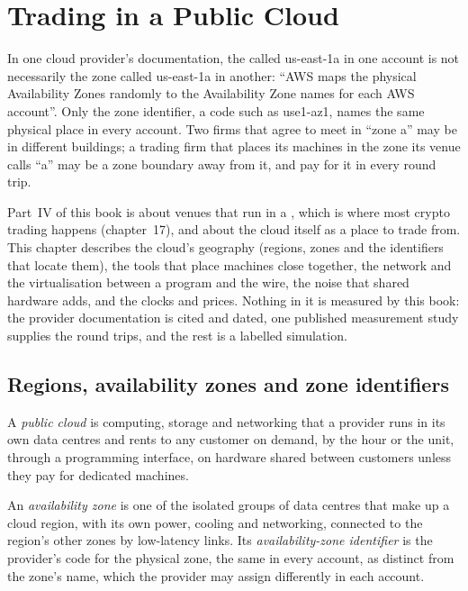 \chapter{Trading in a Public Cloud}\label{ch:nw:trading-in-a-public-cloud}

In one cloud provider's documentation, the  called us-east-1a in one account is not necessarily the zone called us-east-1a
in another: ``AWS maps the physical Availability Zones randomly to the Availability Zone names for each AWS account''. Only the zone
identifier, a code such as use1-az1, names the same physical place in every account. Two firms that agree to meet in ``zone a'' may be
in different buildings; a trading firm that places its machines in the zone its venue calls ``a'' may be a zone boundary away from it, and
pay for it in every round trip.

Part~IV of this book is about venues that run in a , which is where most crypto trading happens (chapter~17), and about the
cloud itself as a place to trade from. This chapter describes the cloud's geography (regions, zones and the identifiers that locate them),
the tools that place machines close together, the network and the virtualisation between a program and the wire, the noise that shared
hardware adds, and the clocks and prices. Nothing in it is measured by this book: the provider documentation is cited and dated, one
published measurement study supplies the round trips, and the rest is a labelled simulation.

\section{Regions, availability zones and zone identifiers}

\begin{definition}\label{def:nw:trading-in-a-public-cloud:cloud}
A \emph{public cloud} is computing, storage and networking that a provider runs in its own data centres and rents to any
customer on demand, by the hour or the unit, through a programming interface, on hardware shared between customers unless they pay for
dedicated machines.
\end{definition}

\begin{definition}\label{def:nw:trading-in-a-public-cloud:azid}
An \emph{availability zone} is one of the isolated groups of data centres that make up a cloud region, with its own
power, cooling and networking, connected to the region's other zones by low-latency links. Its \emph{availability-zone
identifier} is the provider's code for the physical zone, the same in every account, as distinct from the
zone's name, which the provider may assign differently in each account.
\end{definition}

